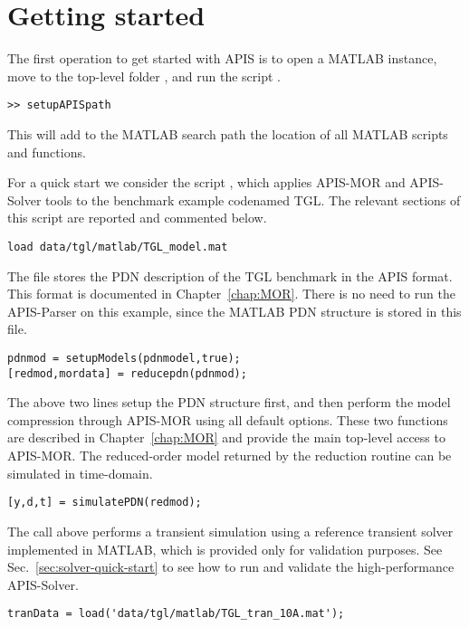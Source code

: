 \section{Getting started}\label{sec:getting-started}

The first operation to get started with APIS is to open a MATLAB instance, move to the top-level folder , and run the script .
\begin{lstlisting}[numbers=none]
>> setupAPISpath
\end{lstlisting}
This will add to the MATLAB search path the location of all MATLAB scripts and functions.

For a quick start we consider the script , which applies APIS-MOR and APIS-Solver tools to the benchmark example codenamed TGL. The relevant sections of this script are reported and commented below.

\begin{lstlisting}[numbers=none]
load data/tgl/matlab/TGL_model.mat
\end{lstlisting}
The file  stores the PDN description of the TGL benchmark in the APIS format. This format is documented in Chapter~\ref{chap:MOR}. There is no need to run the APIS-Parser on this example, since the MATLAB PDN structure is stored in this file.

\begin{lstlisting}[numbers=none]
pdnmod = setupModels(pdnmodel,true);
[redmod,mordata] = reducepdn(pdnmod);
\end{lstlisting}

The above two lines setup the PDN structure first, and then perform the model compression through APIS-MOR using all default options. These two functions are described in Chapter~\ref{chap:MOR} and provide the main top-level access to APIS-MOR. The reduced-order model  returned by the reduction routine can be simulated in time-domain.

\begin{lstlisting}[numbers=none]
[y,d,t] = simulatePDN(redmod);
\end{lstlisting}

The call above performs a transient simulation using a reference transient solver implemented in MATLAB, which is provided only for validation purposes. See Sec.~\ref{sec:solver-quick-start} to see how to run and validate the high-performance APIS-Solver.

\begin{lstlisting}[numbers=none]
tranData = load('data/tgl/matlab/TGL_tran_10A.mat');
\end{lstlisting}

